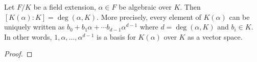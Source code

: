 \begin{theorem}
  Let $F/K$ be a field extension, $\alpha\in F$ be algebraic over $K$. Then
  $[K(\alpha):K]=\deg (\alpha, K)$. More precisely, every element of $K(\alpha)$ can be
  uniquely written as $b_0+b_1\alpha +\cdots b_{d-1}\alpha^{d-1}$ where $d=\deg (\alpha,
  K)$ and $b_i\in K$. In other words, $1, \alpha, \ldots, \alpha^{d-1}$ is a basis for
  $K(\alpha)$ over $K$ as a vector space.
\end{theorem}
\begin{proof}







\end{proof}
